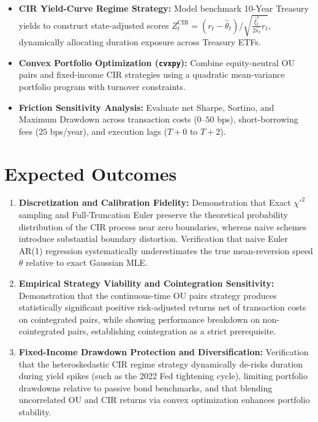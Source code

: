 \documentclass[11pt,a4paper]{article}
\begin{document}
\begin{enumerate}
\begin{itemize}
        \item \textbf{CIR Yield-Curve Regime Strategy:} Model benchmark 10-Year Treasury yields to construct state-adjusted scores $Z_t^{\mathrm{CIR}} = (r_t - \hat{\theta}_t)/\sqrt{\frac{\hat{\xi}_t^2}{2\hat{\kappa}_t} r_t}$, dynamically allocating duration exposure across Treasury ETFs.
        \item \textbf{Convex Portfolio Optimization (\texttt{cvxpy}):} Combine equity-neutral OU pairs and fixed-income CIR strategies using a quadratic mean-variance portfolio program with turnover constraints.
        \item \textbf{Friction Sensitivity Analysis:} Evaluate net Sharpe, Sortino, and Maximum Drawdown across transaction costs ($0$--$50$ bps), short-borrowing fees ($25$ bps/year), and execution lags ($T+0$ to $T+2$).
    \end{itemize}
\end{enumerate}

\section{Expected Outcomes}

\begin{enumerate}
    \item \textbf{Discretization and Calibration Fidelity:} Demonstration that Exact $\chi'^2$ sampling and Full-Truncation Euler preserve the theoretical probability distribution of the CIR process near zero boundaries, whereas naive schemes introduce substantial boundary distortion. Verification that naive Euler AR(1) regression systematically underestimates the true mean-reversion speed $\theta$ relative to exact Gaussian MLE.
    \item \textbf{Empirical Strategy Viability and Cointegration Sensitivity:} Demonstration that the continuous-time OU pairs strategy produces statistically significant positive risk-adjusted returns net of transaction costs on cointegrated pairs, while showing performance breakdown on non-cointegrated pairs, establishing cointegration as a strict prerequisite.
    \item \textbf{Fixed-Income Drawdown Protection and Diversification:} Verification that the heteroskedastic CIR regime strategy dynamically de-risks duration during yield spikes (such as the 2022 Fed tightening cycle), limiting portfolio drawdowns relative to passive bond benchmarks, and that blending uncorrelated OU and CIR returns via convex optimization enhances portfolio stability.
\end{enumerate}
\end{document}
